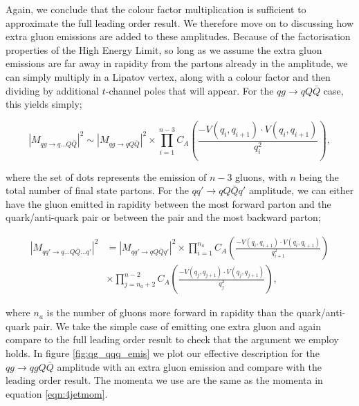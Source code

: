 Again, we conclude that the colour factor multiplication is sufficient to approximate the full leading order result. We therefore move on to discussing how extra gluon emissions are added to these amplitudes. Because of the factorisation properties of the High Energy Limit, so long as we assume the extra gluon emissions are far away in rapidity from the partons already in the amplitude, we can simply multiply in a Lipatov vertex, along with a colour factor and then dividing by additional $t$-channel poles that will appear. For the $qg \to qQ\bar{Q}$ case, this yields simply;

\begin{equation}
|M_{qg \to q...Q\bar{Q}}|^2 \sim |M_{qg \to qQ\bar{Q}}|^2 \times \prod_{i=1}^{n-3}  C_A \left(\frac{-V(q_i,q_{i+1}) \cdot V(q_i,q_{i+1})}{q_i^2} \right),
\end{equation}

where the set of dots represents the emission of $n-3$ gluons, with $n$ being the total number of final state partons. For the $qq' \to qQ\bar{Q}q'$ amplitude, we can either have the gluon emitted in rapidity between the most forward parton and the quark/anti-quark pair or between the pair and the most backward parton;

\begin{equation}
\begin{split}
|M_{qq' \to q...Q\bar{Q}...q'}|^2 &= |M_{qq' \to qQ\bar{Q}q'}|^2 \times \prod_{i=1}^{n_a} C_A \left(\frac{-V(q_i,q_{i+1}) \cdot V(q_i,q_{i+1})}{q_{i+1}^2} \right) \\
&\times \prod_{j=n_a+2}^{n-2} C_A \left(\frac{-V(q_j,q_{j+1}) \cdot V(q_j,q_{j+1})}{q_j^2} \right),
\end{split}
\end{equation}

where $n_a$ is the number of gluons more forward in rapidity than the quark/anti-quark pair. We take the simple case of emitting one extra gluon and again compare to the full leading order result to check that the argument we employ holds. In figure \ref{fig:qg_qqq_emis} we plot our effective description for the $qg \to qgQ\bar{Q}$ amplitude with an extra gluon emission and compare with the leading order result. The momenta we use are the same as the momenta in equation \ref{eqn:4jetmom}. 

